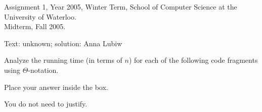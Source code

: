 \begin{usage}
Assignment 1, Year 2005, Winter Term, School of Computer Science at the University of Waterloo. \\
Midterm, Fall 2005.
\end{usage}
\begin{authorship}
Text: unknown; solution: Anna Lubiw
\end{authorship}

\newcommand{\answerbox}{
\hspace*{\fill}
\fbox{\rule{0mm}{10mm}\rule{50mm}{0mm}}
}


Analyze the running time (in terms of $n$) for each of the following
code fragments using $\Theta$-notation.
%
\begin{spaceForAnswer}  Place your answer inside the box.\end{spaceForAnswer}%
%
You do not need to justify.
